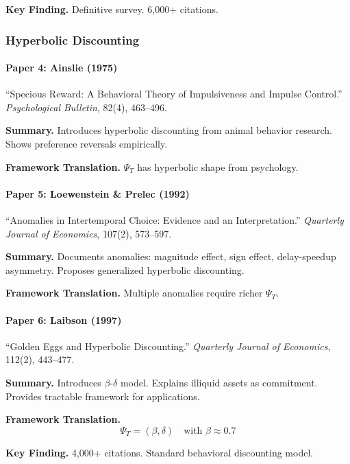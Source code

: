 \textbf{Key Finding.}
Definitive survey. 6,000+ citations.

\subsubsection{Hyperbolic Discounting}

\paragraph{Paper 4: Ainslie (1975)}

``Specious Reward: A Behavioral Theory of Impulsiveness and Impulse Control.''
\textit{Psychological Bulletin}, 82(4), 463--496.

\textbf{Summary.}
Introduces hyperbolic discounting from animal behavior research.
Shows preference reversals empirically.

\textbf{Framework Translation.}
$\Psi_T$ has hyperbolic shape from psychology.

\paragraph{Paper 5: Loewenstein \& Prelec (1992)}

``Anomalies in Intertemporal Choice: Evidence and an Interpretation.''
\textit{Quarterly Journal of Economics}, 107(2), 573--597.

\textbf{Summary.}
Documents anomalies: magnitude effect, sign effect, delay-speedup asymmetry.
Proposes generalized hyperbolic discounting.

\textbf{Framework Translation.}
Multiple anomalies require richer $\Psi_T$.

\paragraph{Paper 6: Laibson (1997)}

``Golden Eggs and Hyperbolic Discounting.''
\textit{Quarterly Journal of Economics}, 112(2), 443--477.

\textbf{Summary.}
Introduces $\beta$-$\delta$ model. Explains illiquid assets as commitment.
Provides tractable framework for applications.

\textbf{Framework Translation.}
\begin{equation}
\Psi_T = (\beta, \delta) \quad \text{with } \beta \approx 0.7
\end{equation}

\textbf{Key Finding.}
4,000+ citations. Standard behavioral discounting model.


